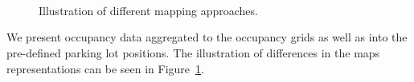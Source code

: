 \begin{figure}[p]%
\centering
{} \\
 \\
 \\
\caption{Illustration of different mapping approaches.}
\label{fig:different_mappings}
\end{figure}

We present occupancy data aggregated to the occupancy grids as well as into
the pre-defined parking lot positions. The illustration of differences in the
maps representations can be seen in Figure~\ref{fig:different_mappings}.

